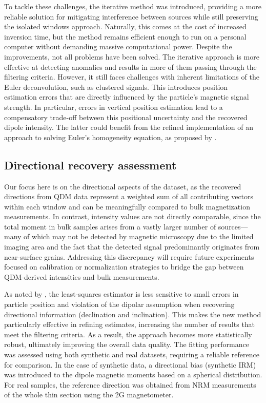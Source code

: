 To tackle these challenges, the iterative method was introduced, providing a more reliable solution for mitigating interference between sources while still preserving the isolated windows approach. Naturally, this comes at the cost of increased inversion time, but the method remains efficient enough to run on a personal computer without demanding massive computational power. Despite the improvements, not all problems have been solved. The iterative approach is more effective at detecting anomalies and results in more of them passing through the filtering criteria. However, it still faces challenges with inherent limitations of the Euler deconvolution, such as clustered signals. This introduces position estimation errors that are directly influenced by the particle's magnetic signal strength. In particular, errors in vertical position estimation lead to a compensatory trade-off between this positional uncertainty and the recovered dipole intensity. The latter could benefit from the refined implementation of an approach to solving Euler's homogeneity equation, as proposed by \citet{Uieda2025}.

\subsection{Directional recovery assessment}

Our focus here is on the directional aspects of the dataset, as the recovered directions from QDM data represent a weighted sum of all contributing vectors within each window and can be meaningfully compared to bulk magnetization measurements. In contrast, intensity values are not directly comparable, since the total moment in bulk samples arises from a vastly larger number of sources—many of which may not be detected by magnetic microscopy due to the limited imaging area and the fact that the detected signal predominantly originates from near-surface grains. Addressing this discrepancy will require future experiments focused on calibration or normalization strategies to bridge the gap between QDM-derived intensities and bulk measurements.

As noted by \citet{Oliveira2015Estimation}, the least-squares estimator is less sensitive to small errors in particle position and violation of the dipolar assumption when recovering directional information (declination and inclination). This makes the new method particularly effective in refining estimates, increasing the number of results that meet the filtering criteria. As a result, the approach becomes more statistically robust, ultimately improving the overall data quality. The fitting performance was assessed using both synthetic and real datasets, requiring a reliable reference for comparison. In the case of synthetic data, a directional bias (synthetic IRM) was introduced to the dipole magnetic moments based on a spherical distribution. For real samples, the reference direction was obtained from NRM measurements of the whole thin section using the 2G magnetometer.


